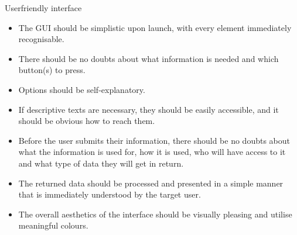\begin{requirement}{Userfriendly interface} 
\begin{itemize}
  \item The \ac{GUI} should be simplistic upon launch, with every element
  immediately recognisable.
  \item There should be no doubts about what information is needed and which
  button(s) to press.
  \item Options should be self-explanatory.
  \item If descriptive texts are necessary, they should be easily accessible,
  and it should be obvious how to reach them.
  \item Before the user submits their information, there should be no doubts
  about what the information is used for, how it is used, who will have access
  to it and what type of data they will get in return.
  \item The returned data should be processed and presented in a simple manner
  that is immediately understood by the target user.
  \item The overall aesthetics of the interface should be visually pleasing and
  utilise meaningful colours.
\end{itemize}
\end{requirement}